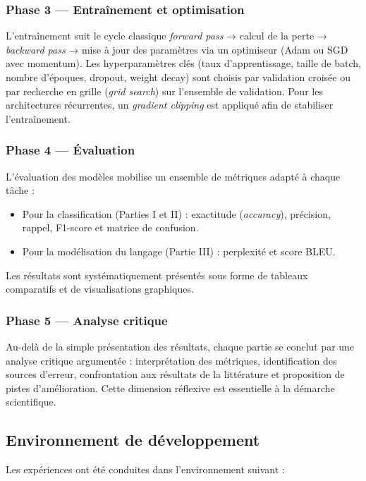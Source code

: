 \documentclass[11pt,a4paper]{article}
\begin{document}
\subsubsection{Phase 3 — Entraînement et optimisation}

L'entraînement suit le cycle classique \textit{forward pass} → calcul de la perte →
\textit{backward pass} → mise à jour des paramètres via un optimiseur (Adam ou SGD
avec momentum). Les hyperparamètres clés (taux d'apprentissage, taille de batch, nombre
d'époques, dropout, weight decay) sont choisis par validation croisée ou par recherche
en grille (\textit{grid search}) sur l'ensemble de validation. Pour les architectures
récurrentes, un \textit{gradient clipping} est appliqué afin de stabiliser l'entraînement.

\subsubsection{Phase 4 — Évaluation}

L'évaluation des modèles mobilise un ensemble de métriques adapté à chaque tâche :
\begin{itemize}
  \item Pour la classification (Parties I et II) : exactitude (\textit{accuracy}),
        précision, rappel, F1-score et matrice de confusion.
  \item Pour la modélisation du langage (Partie III) : perplexité et score BLEU.
\end{itemize}
Les résultats sont systématiquement présentés sous forme de tableaux comparatifs et
de visualisations graphiques.

\subsubsection{Phase 5 — Analyse critique}

Au-delà de la simple présentation des résultats, chaque partie se conclut par une
analyse critique argumentée : interprétation des métriques, identification des sources
d'erreur, confrontation aux résultats de la littérature et proposition de pistes
d'amélioration. Cette dimension réflexive est essentielle à la démarche scientifique.

\subsection{Environnement de développement}

Les expériences ont été conduites dans l'environnement suivant :
\end{document}
